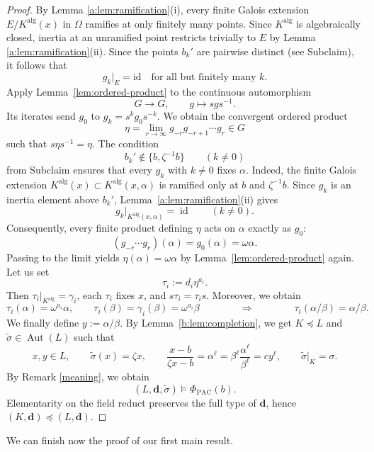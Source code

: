 \documentclass[10pt,a4paper]{amsart}
\theoremstyle{definition}
\newenvironment{claimproof}[1][Proof of Claim \theclaim.]
 {%
	\proof[#1]%
\renewcommand*\qedsymbol{$\square$\tiny{Claim \theclaim}}
}
{%
	\endproof%
}
\newcommand{\alg}{\mathrm{alg}}
\newcommand{\bd}{\boldsymbol d}
\DeclareMathOperator{\Aut}{Aut}
\DeclareMathOperator{\id}{id}
\begin{document}
\begin{proof}
\begin{claimproof}
\smallskip
By Lemma \ref{a:lem:ramification}(i), every finite Galois extension $E/K^\alg(x)$ in $\Omega$ ramifies at only
finitely many points. Since $K^\alg$ is algebraically closed, inertia at an
unramified point restricts trivially to $E$ by Lemma \ref{a:lem:ramification}(ii). Since the points $b_k'$ are pairwise distinct (see Subclaim), it follows that
\[
g_k|_E=\mathrm{id}\quad\text{for all but finitely many }k.
\]
Apply Lemma~\ref{lem:ordered-product} to the continuous
automorphism
\[
G\longrightarrow G,\qquad g\longmapsto sgs^{-1}.
\]
Its iterates send $g_0$ to $g_k=s^kg_0s^{-k}$.
We obtain the convergent ordered product
\[
\eta=\lim_{r\to\infty}g_{-r}g_{-r+1}\cdots g_r\in G
\]
such that $s\eta s^{-1}=\eta$. The condition
\[
b_k'\notin\{b,\zeta^{-1}b\}\qquad(k\ne0)
\]
from Subclaim ensures that every $g_k$ with $k\ne0$ fixes $\alpha$.
Indeed, the finite Galois extension
$K^{\alg}(x)\subset K^{\alg}(x,\alpha)$ is ramified only at $b$ and $\zeta^{-1}b$.
Since $g_k$ is an inertia element above $b_k'$,
Lemma~\ref{a:lem:ramification}(ii) gives
\[
g_k|_{K^{\alg}(x,\alpha)}=\id
\qquad(k\ne0).
\]
Consequently, every finite product defining $\eta$ acts on
$\alpha$ exactly as $g_0$:
\[
(g_{-r}\cdots g_r)(\alpha)=g_0(\alpha)=\omega\alpha.
\]
Passing to the limit yields $\eta(\alpha)=\omega\alpha$ by Lemma~\ref{lem:ordered-product} again.
\end{claimproof}
Let us set
\[
\tau_i:=d_i\eta^{a_i}.
\]
Then $\tau_i|_{K^{\alg}}=\gamma_i$, each $\tau_i$ fixes $x$, and
$s\tau_i=\tau_i s$. Moreover, we obtain
\[
\tau_i(\alpha)=\omega^{a_i}\alpha,\qquad
\tau_i(\beta)=\gamma_i(\beta)=\omega^{a_i}\beta\qquad \qquad \Longrightarrow\qquad \qquad
\tau_i(\alpha/\beta)=\alpha/\beta.
\]
We finally define $y:=\alpha/\beta$. By Lemma~\ref{b:lem:completion}, we get $K\preccurlyeq L$ and $\widetilde{\sigma}\in \Aut(L)$ such that
\[
x,y\in L,\qquad
\widetilde\sigma(x)=\zeta x,\qquad
\frac{x-b}{\zeta x-b}=\alpha ^\ell=\beta ^\ell\frac{\alpha ^\ell}{\beta ^\ell}=cy^\ell,\qquad \widetilde{\sigma}|_K=\sigma.
\]
By Remark \ref{meaning}, we obtain
\[
(L,\bd,\widetilde{\sigma})\models \Phi_{\mathrm{PAC}}(b).
\]
Elementarity on the
field reduct preserves the full type of $\bd$, hence $(K,\bd)\preccurlyeq(L,\bd)$.
\end{proof}

We can finish now the proof of our first main result.
\end{document}
